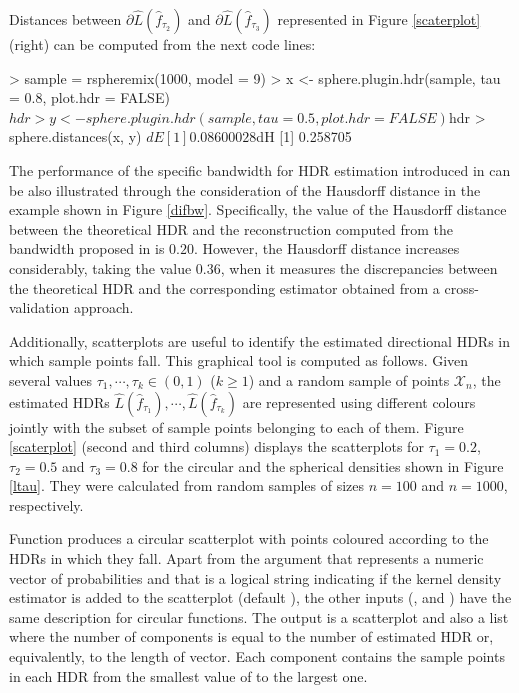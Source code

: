 Distances between $\partial \hat{L}(\hat{f}_{\tau_2})$ and $\partial \hat{L}(\hat{f}_{\tau_3})$ represented in Figure \ref{scaterplot} (right) can be computed from the next code lines: 
\begin{example}
> sample = rspheremix(1000, model = 9)
> x <- sphere.plugin.hdr(sample, tau = 0.8, plot.hdr = FALSE)$hdr
> y <- sphere.plugin.hdr(sample, tau = 0.5, plot.hdr = FALSE)$hdr
> sphere.distances(x, y)
$dE
[1] 0.08600028
$dH
[1] 0.258705
\end{example}


The performance of the specific bandwidth for HDR estimation introduced in \cite{saavedra2020nonparametric} can be also illustrated through the consideration of the Hausdorff distance in the example shown in  Figure \ref{difbw}. Specifically, the value of the Hausdorff distance between the theoretical HDR and the reconstruction computed from the bandwidth proposed in \cite{saavedra2020nonparametric} is $0.20$. However, the Hausdorff distance increases considerably, taking the value $0.36$, when it measures the discrepancies between the theoretical HDR and the corresponding estimator obtained from a cross-validation approach. 



Additionally, scatterplots are useful to identify the estimated directional HDRs in which sample points fall. This graphical tool is computed as follows. Given several values $\tau_1,\cdots,\tau_k\in (0,1)$ ($k\geq 1$) and a random sample of points $\mathcal{X}_n$, the estimated HDRs $\hat{L}(\hat{f}_{\tau_1}),\cdots,\hat{L}(\hat{f}_{\tau_k})$ are represented using different colours jointly with the subset of sample points belonging to each of them. Figure \ref{scaterplot} (second and third columns) displays the scatterplots for $\tau_1=0.2$, $\tau_2=0.5$ and $\tau_3=0.8$ for the circular and the spherical densities shown in Figure \ref{ltau}. They were calculated from random samples of sizes $n=100$ and $n=1000$, respectively.




Function  produces a circular scatterplot with points coloured according to the HDRs in which they fall. Apart from the argument  that represents a numeric vector of probabilities and  that is a logical string indicating if the kernel density estimator is added to the scatterplot (default ), the other inputs (,  and ) have the same description for circular functions. The output is a scatterplot and also a list where the number of components is equal to the number of estimated HDR or, equivalently, to the length of  vector. Each component contains the sample points in each HDR from the smallest value of  to the largest one.

